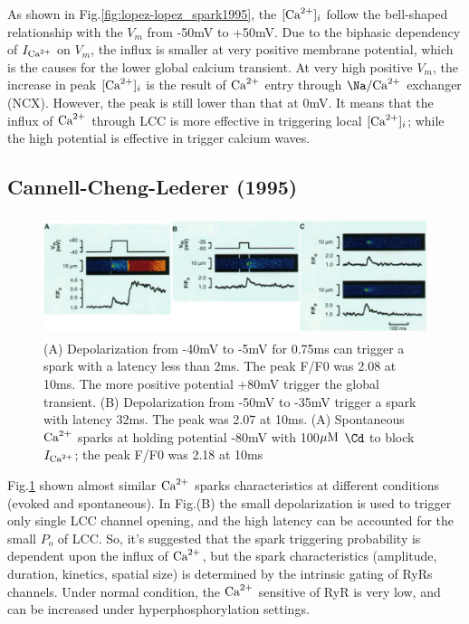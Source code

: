 As shown in Fig.\ref{fig:lopez-lopez_spark1995}, the $[{\text{Ca}^{2+}}]_i$ follow the
bell-shaped relationship with the $V_m$ from -50mV to +50mV. Due to the biphasic
dependency of $I_{\text{Ca}^{2+}}$ on $V_m$, the influx is smaller at very positive membrane
potential, which is the causes for the lower global calcium transient. At very
high positive $V_m$, the increase in peak $[{\text{Ca}^{2+}}]_i$ is the result of ${\text{Ca}^{2+}}$ entry
through $\Na/\Ca$ exchanger (NCX). However, the peak is still lower than
that at 0mV. It means that the influx of ${\text{Ca}^{2+}}$ through LCC is more effective in
triggering local $[{\text{Ca}^{2+}}]_i$; while the high potential is effective in trigger
calcium waves.

\subsection{Cannell-Cheng-Lederer (1995)}



\begin{figure}[ht]
  \centerline{\includegraphics[height=3.5cm,
    angle=0]{./images/spark_cannell1995.eps}}
    \label{fig:spark_cannell1995}
    \caption{(A) Depolarization from -40mV to -5mV for 0.75ms can trigger a
    spark with a latency less than 2ms. The peak F/F0 was 2.08 at 10ms. The
    more positive potential +80mV trigger the global transient. (B)
    Depolarization from -50mV to -35mV trigger a spark with latency 32ms. The
    peak was 2.07 at 10ms. (A) Spontaneous ${\text{Ca}^{2+}}$ sparks at holding potential
    -80mV with 100${\mu\text{M}}$ $\Cd$ to block $I_{\text{Ca}^{2+}}$; the peak F/F0 was 2.18 at
    10ms}
 \end{figure}
    
Fig.\ref{fig:spark_cannell1995} shown almost similar ${\text{Ca}^{2+}}$ sparks
characteristics at different conditions (evoked and spontaneous). In Fig.(B) the
small depolarization is used to trigger only single LCC channel opening, and the
high latency can be accounted for the small $P_o$ of LCC. So, it's suggested
that the spark triggering probability is dependent upon the influx of ${\text{Ca}^{2+}}$, but
the spark characteristics (amplitude, duration, kinetics, spatial size) is
determined by the intrinsic gating of RyRs channels. Under normal condition, the
${\text{Ca}^{2+}}$ sensitive of RyR is very low, and can be increased under
hyperphosphorylation settings.

